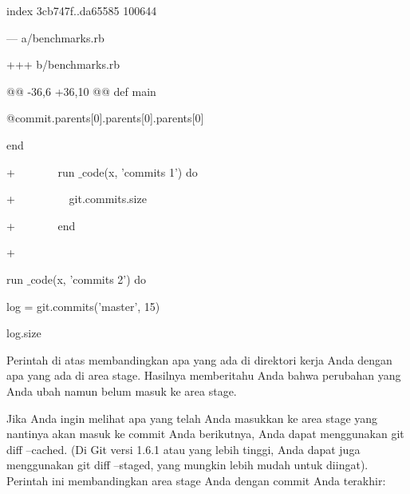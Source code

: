 \noindent 
{\fontsize{14pt}{14pt}\selectfont index 3cb747f..da65585 100644 \\} \par
\noindent 
{\fontsize{14pt}{14pt}\selectfont --- a/benchmarks.rb \\} \par
\noindent 
{\fontsize{14pt}{14pt}\selectfont +++ b/benchmarks.rb \\} \par
\noindent 
{\fontsize{14pt}{14pt}\selectfont @@ -36,6 +36,10 @@ def main \\} \par
\noindent 
{\fontsize{14pt}{14pt}\selectfont @commit.parents[0].parents[0].parents[0] \\} \par
\noindent 
{\fontsize{14pt}{14pt}\selectfont end \\} \par
\vspace{14pt}
\noindent 
{\fontsize{14pt}{14pt}\selectfont +~~~~~~~ run $  \_  $code(x, 'commits 1') do \\} \par
\noindent 
{\fontsize{14pt}{14pt}\selectfont +~~~~~~~~~ git.commits.size \\} \par
\noindent 
{\fontsize{14pt}{14pt}\selectfont +~~~~~~~ end \\} \par
\noindent 
{\fontsize{14pt}{14pt}\selectfont + \\} \par
\noindent 
{\fontsize{14pt}{14pt}\selectfont run $  \_  $code(x, 'commits 2') do \\} \par
\noindent 
{\fontsize{14pt}{14pt}\selectfont log = git.commits('master', 15) \\} \par
\noindent 
{\fontsize{14pt}{14pt}\selectfont log.size \\} \par
\vspace{14pt}
\noindent 
{\fontsize{14pt}{14pt}\selectfont Perintah di atas membandingkan apa yang ada di direktori kerja Anda dengan apa yang ada di area stage. Hasilnya memberitahu Anda bahwa perubahan yang Anda ubah namun belum masuk ke area stage. \\} \par
\vspace{14pt}
\noindent 
{\fontsize{14pt}{14pt}\selectfont Jika Anda ingin melihat apa yang telah Anda masukkan ke area stage yang nantinya akan masuk ke commit Anda berikutnya, Anda dapat menggunakan $  $git diff --cached. (Di Git versi 1.6.1 atau yang lebih tinggi, Anda dapat juga menggunakan $  $git diff --staged, yang mungkin lebih mudah untuk diingat). Perintah ini membandingkan area stage Anda dengan commit Anda terakhir: \\} \par
